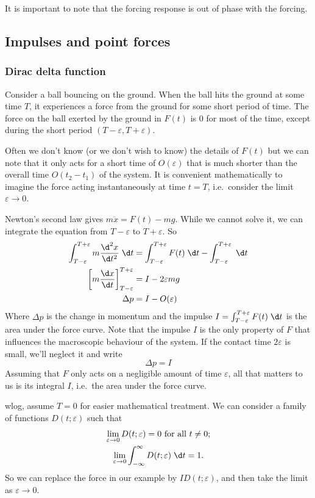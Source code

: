 \documentclass[a4paper]{article}
\begin{document}
It is important to note that the forcing response is out of phase with the forcing.
\subsection{Impulses and point forces}
\subsubsection{Dirac delta function}
Consider a ball bouncing on the ground. When the ball hits the ground at some time $T$, it experiences a force from the ground for some short period of time. The force on the ball exerted by the ground in $F(t)$ is $0$ for most of the time, except during the short period $(T - \varepsilon, T + \varepsilon)$.

Often we don't know (or we don't wish to know) the details of $F(t)$ but we can note that it only acts for a short time of $O(\varepsilon)$ that is much shorter than the overall time $O(t_2 - t_1)$ of the system. It is convenient mathematically to imagine the force acting instantaneously at time $t = T$, i.e.\ consider the limit $\varepsilon\to 0$.

Newton's second law gives $m\ddot x = F(t) - mg$. While we cannot solve it, we can integrate the equation from $T - \varepsilon$ to $T + \varepsilon$. So
\begin{align*}
  \int_{T - \varepsilon}^{T + \varepsilon} m\frac{\d ^2 x}{\d t^2}\;\d t &= \int_{T - \varepsilon}^{T + \varepsilon} F(t)\;\d t - \int_{T - \varepsilon}^{T + \varepsilon}\;\d t\\
  \left[ m\frac{\d x}{\d t}\right]^{T + \varepsilon}_{T - \varepsilon} &= I - 2\varepsilon mg\\
  \Delta p &= I - O(\varepsilon)
\end{align*}
Where $\Delta p$ is the change in momentum and the impulse $I = \int_{T - \varepsilon}^{T + \varepsilon} F(t) \;\d t$ is the area under the force curve. Note that the impulse $I$ is the only property of $F$ that influences the macroscopic behaviour of the system. If the contact time $2\varepsilon$ is small, we'll neglect it and write
\[
  \Delta p = I
\]
Assuming that $F$ only acts on a negligible amount of time $\varepsilon$, all that matters to us is its integral $I$, i.e.\ the area under the force curve.

wlog, assume $T = 0$ for easier mathematical treatment. We can consider a family of functions $D(t; \varepsilon)$ such that
\begin{gather*}
  \lim_{\varepsilon\to 0} D(t; \varepsilon) = 0 \text{ for all }t \not= 0;\\
  \lim_{\varepsilon\to 0}\int_{-\infty}^\infty D(t; \varepsilon) \;\d t = 1.
\end{gather*}
So we can replace the force in our example by $ID(t; \varepsilon)$, and then take the limit as $\varepsilon \to 0$.
\end{document}
